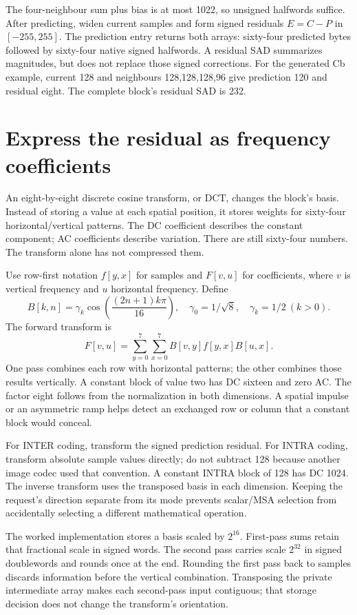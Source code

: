 The four-neighbour sum plus bias is at most 1022, so unsigned halfwords suffice.
After predicting, widen current samples and form signed residuals $E=C-P$ in
$[-255,255]$. The prediction entry returns both arrays: sixty-four predicted
bytes followed by sixty-four native signed halfwords. A residual SAD summarizes
magnitudes, but does not replace those signed corrections. For the generated
Cb example, current 128 and neighbours 128,128,128,96 give prediction 120 and
residual eight. The complete block's residual SAD is 232.



\section{Express the residual as frequency coefficients}

An eight-by-eight discrete cosine transform, or DCT, changes the block's basis.
Instead of storing a value at each spatial position, it stores weights for
sixty-four horizontal/vertical patterns. The DC coefficient describes the constant
component; AC coefficients describe variation. There are still sixty-four numbers.
The transform alone has not compressed them.

Use row-first notation $f[y,x]$ for samples and $F[v,u]$ for coefficients, where
$v$ is vertical frequency and $u$ horizontal frequency. Define
\[
  B[k,n]=\gamma_k\cos\!\left(\frac{(2n+1)k\pi}{16}\right),\quad
  \gamma_0=1/\sqrt8,\quad \gamma_k=1/2\ (k>0).
\]
The forward transform is
\[
  F[v,u]=\sum_{y=0}^{7}\sum_{x=0}^{7}B[v,y]f[y,x]B[u,x].
\]
One pass combines each row with horizontal patterns; the other combines those
results vertically. A constant block of value two has DC sixteen and zero AC.
The factor eight follows from the normalization in both dimensions. A spatial
impulse or an asymmetric ramp helps detect an exchanged row or column that a
constant block would conceal.

For INTER coding, transform the signed prediction residual. For INTRA coding,
transform absolute sample values directly; do not subtract 128 because another
image codec used that convention. A constant INTRA block of 128 has DC 1024.
The inverse transform uses the transposed basis in each dimension. Keeping the
request's direction separate from its mode prevents scalar/MSA selection from
accidentally selecting a different mathematical operation.

The worked implementation stores a basis scaled by $2^{16}$. First-pass sums
retain that fractional scale in signed words. The second pass carries scale
$2^{32}$ in signed doublewords and rounds once at the end. Rounding the first
pass back to samples discards information before the vertical combination.
Transposing the private intermediate array makes each second-pass input contiguous;
that storage decision does not change the transform's orientation.

